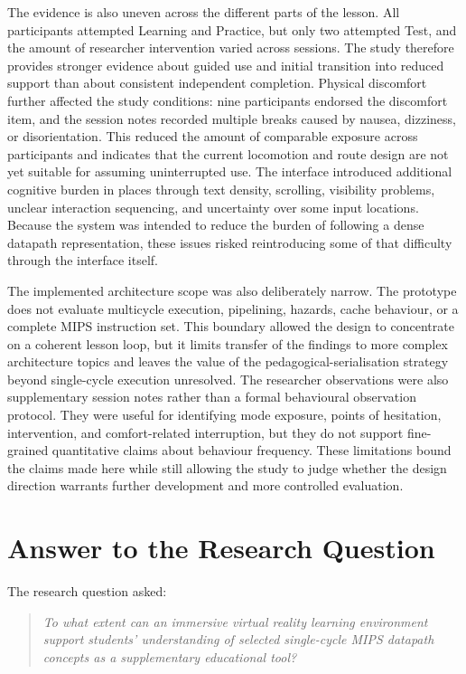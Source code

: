 The evidence is also uneven across the different parts of the lesson. All participants attempted Learning and Practice, but only two attempted Test, and the amount of researcher intervention varied across sessions. The study therefore provides stronger evidence about guided use and initial transition into reduced support than about consistent independent completion. Physical discomfort further affected the study conditions: nine participants endorsed the discomfort item, and the session notes recorded multiple breaks caused by nausea, dizziness, or disorientation. This reduced the amount of comparable exposure across participants and indicates that the current locomotion and route design are not yet suitable for assuming uninterrupted use. The interface introduced additional cognitive burden in places through text density, scrolling, visibility problems, unclear interaction sequencing, and uncertainty over some input locations. Because the system was intended to reduce the burden of following a dense datapath representation, these issues risked reintroducing some of that difficulty through the interface itself.

The implemented architecture scope was also deliberately narrow. The prototype does not evaluate multicycle execution, pipelining, hazards, cache behaviour, or a complete MIPS instruction set. This boundary allowed the design to concentrate on a coherent lesson loop, but it limits transfer of the findings to more complex architecture topics and leaves the value of the pedagogical-serialisation strategy beyond single-cycle execution unresolved. The researcher observations were also supplementary session notes rather than a formal behavioural observation protocol. They were useful for identifying mode exposure, points of hesitation, intervention, and comfort-related interruption, but they do not support fine-grained quantitative claims about behaviour frequency. These limitations bound the claims made here while still allowing the study to judge whether the design direction warrants further development and more controlled evaluation.
\section{Answer to the Research Question}

The research question asked:

\begin{quote}
\textit{To what extent can an immersive virtual reality learning environment support students' understanding of selected single-cycle MIPS datapath concepts as a supplementary educational tool?}
\end{quote}

